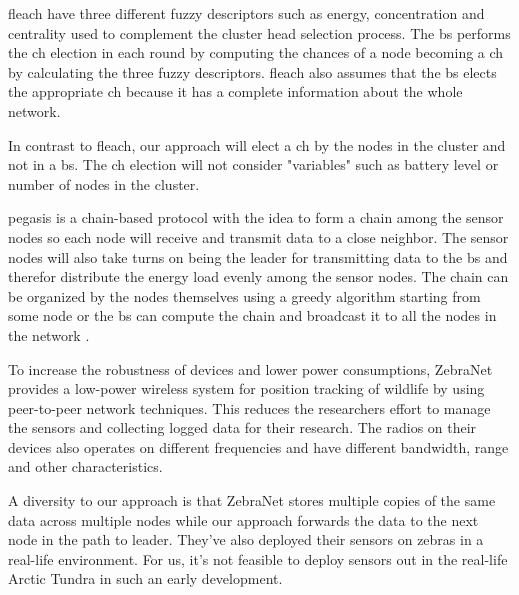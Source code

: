 \documentclass[USenglish]{uit-thesis}
\begin{document}

\Gls{fleach} \cite{fuzzy_logic, ch_fuzzy} have three different fuzzy descriptors such as energy, concentration and centrality used to complement the cluster head selection process. The \gls{bs} performs the \gls{ch} election in each round by computing the chances of a node becoming a \gls{ch} by calculating the three fuzzy descriptors. \Gls{fleach} also assumes that the \gls{bs} elects the appropriate \gls{ch} because it has a complete information about the whole network.

In contrast to \gls{fleach}, our approach will elect a \gls{ch} by the nodes in the cluster and not in a \gls{bs}. The \gls{ch} election will not consider "variables" such as battery level or number of nodes in the cluster.


\Gls{pegasis} is a chain-based protocol with the idea to form a chain among the sensor nodes so each node will receive and transmit data to a close neighbor. The sensor nodes will also take turns on being the leader for transmitting data to the \gls{bs} and therefor distribute the energy load evenly among the sensor nodes. The chain can be organized by the nodes themselves using a greedy algorithm starting from some node or the \gls{bs} can compute the chain and broadcast it to all the nodes in the network \cite{pegasis}.

To increase the robustness of devices and lower power consumptions, ZebraNet \cite{zebranet} provides a low-power wireless system for position tracking of wildlife by using peer-to-peer network techniques. This reduces the researchers effort to manage the sensors and collecting logged data for their research. The radios on their devices also operates on different frequencies and have different bandwidth, range and other characteristics.

A diversity to our approach is that ZebraNet stores multiple copies of the same data across multiple nodes while our approach forwards the data to the next node in the path to leader. They've also deployed their sensors on zebras in a real-life environment. For us, it's not feasible to deploy sensors out in the real-life Arctic Tundra in such an early development.

\end{document}
